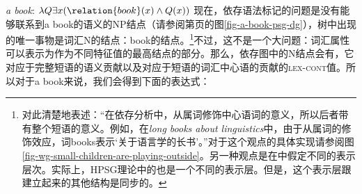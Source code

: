 \ex \emph{a book}: $\lambda Q \exists x (\relation{book}(x) \wedge Q(x))$
\zl
现在，依存语法标记的问题是没有能够联系到a book的语义的NP结点（请参阅第\pageref{fig-a-book-psg-dg}页的图\ref{fig-a-book-psg-dg}），树中出现的唯一事物是词汇N的结点：book的结点。\footnote{\citet[--392]{Hudson2003a}\indexwgc 对此清楚地表述：“在依存分析中，从属词修饰中心语词的意义，所以后者带有整个短语的意义。例如，在\emph{long books about linguistics}中，由于从属词的修饰效应，词books表示‘关于语言学的长书’。”对于这个观点的具体实现请参阅图\vref{fig-wg-small-children-are-playing-outside}。另一种观点是在\mttc 中假定不同的表示层次\citep{Melcuk81a}。实际上，HPSG理论中的\contvc 也是一个不同的表示层。但是，这个表示层跟建立起来的其他结构是同步的。}不过，这不是一个大问题：词汇属性可以表示为作为不同特征值的最高结点的部分。那么，依存图中的N结点会有\contvc，它对应于完整短语的语义贡献以及对应于短语的词汇中心语的贡献的\textsc{lex-cont}值。所以对于a book来说，我们会得到下面的表达式：
\ea
{}
